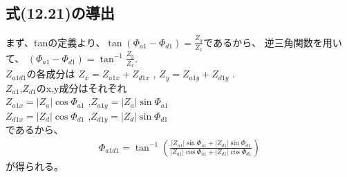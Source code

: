 \documentclass[fleqn,11pt,a4paper,dvipdfmx]{jsarticle}
\numberwithin{equation}{section}
\begin{document}
\newpage
\subsection*{式(12.21)の導出}
まず、tanの定義より、$\tan\left(\Phi_{a1} - \Phi_{d1}\right) = \frac{Z_y}{Z_x}$であるから、
逆三角関数を用いて、
$\left(\Phi_{a1} - \Phi_{d1}\right) = \tan^{-1}\frac{Z_y}{Z_x}$.\\
$Z_{a1d1}$の各成分は
$Z_x = Z_{a1x} + Z_{d1x}$ , $Z_y = Z_{a1y} + Z_{d1y}$ .\\
$Z_{a1}$,$Z_{d1}$のx,y成分はそれぞれ\\
$Z_{a1x} = \left|Z_a\right| \cos \Phi_{a1}$ ,$Z_{a1y} = \left|Z_a\right| \sin \Phi_{a1}$\\
$Z_{d1x} = \left|Z_d\right| \cos \Phi_{d1}$ ,$Z_{d1y} = \left|Z_d\right| \sin \Phi_{d1}$\\
であるから、
\begin{align*}
  \Phi_{a1d1} = \tan^{-1}\left( \frac{\left| Z_{a1} \right| \sin \Phi_{a1} + \left| Z_{d1} \right| \sin \Phi_{d1} }{\left| Z_{a1} \right| \cos \Phi_{a1} + \left| Z_{d1} \right| \cos \Phi_{d1}}\right)
\end{align*}
が得られる。
\end{document}
